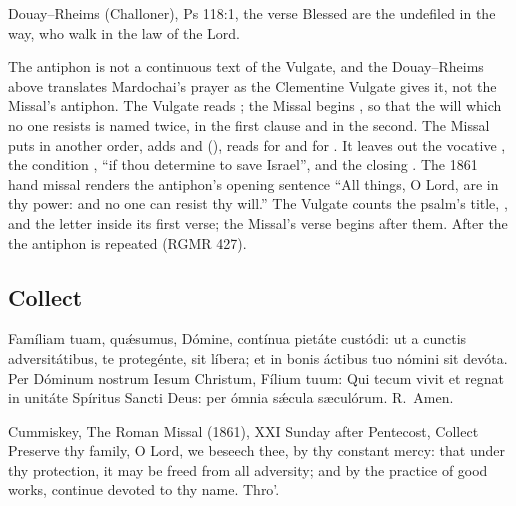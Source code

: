 \begin{englishwitness}{Douay--Rheims (Challoner), Ps 118:1, the verse}
Blessed are the undefiled in the way, who walk in the law of the Lord.
\end{englishwitness}

\noindent The antiphon is not a continuous text of the Vulgate, and the
Douay--Rheims above translates Mardochai's prayer as the Clementine Vulgate gives
it, not the Missal's antiphon. The Vulgate reads ; the Missal begins , so that the will which no one resists is named twice, in the
first clause and in the second. The Missal puts 
in another order, adds  and  (), reads  for  and  for . It leaves out the vocative , the
condition , ``if thou determine to save
Israel'', and the closing . The 1861
hand missal renders the antiphon's opening sentence ``All things, O Lord, are
in thy power: and no one can resist thy will.'' The Vulgate counts the psalm's
title, , and the letter  inside its first verse;
the Missal's verse begins after them. After the  the
antiphon is repeated (RGMR 427).

\subsection{Collect}
\label{proper-collect}


\begin{latinproper}
Famíliam tuam, quǽsumus, Dómine, contínua pietáte custódi: ut a cunctis
adversitátibus, te protegénte, sit líbera; et in bonis áctibus tuo nómini sit
devóta. Per Dóminum nostrum Iesum Christum, Fílium tuum: Qui tecum vivit et
regnat in unitáte Spíritus Sancti Deus: per ómnia sǽcula sæculórum. R.~Amen.
\end{latinproper}

\begin{englishwitness}{Cummiskey, The Roman Missal (1861), XXI Sunday after Pentecost, Collect}
Preserve thy family, O Lord, we beseech thee, by thy constant mercy: that under
thy protection, it may be freed from all adversity; and by the practice of good
works, continue devoted to thy name. Thro'.
\end{englishwitness}

